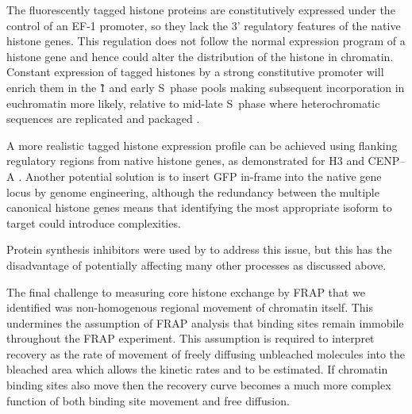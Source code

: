     The fluorescently tagged histone proteins are constitutively expressed
    under the control of an EF-1\textalpha{} promoter,
    so they lack the 3' regulatory features of the native histone genes.
    This regulation does not follow the normal
    expression program of a histone gene
    and hence could alter the distribution of the histone in chromatin.
    Constant expression of tagged histones by a strong constitutive promoter
    will enrich them in the \G1{} and early S~phase pools
    making subsequent incorporation in euchromatin more likely,
    relative to mid-late S~phase where heterochromatic sequences
    are replicated and packaged \citep{DNA-replication-timing}.

    A more realistic tagged histone expression profile can be achieved using
    flanking regulatory regions from native histone genes,
    as demonstrated for H3 and CENP--A \citep{pMH3-plasmid,Kevin-pCA-TAG}.
    Another potential solution is to insert GFP
    in-frame into the native gene locus by genome engineering,
    although the redundancy between the multiple canonical histone genes means
    that identifying the most appropriate isoform to target
    could introduce complexities.

    Protein synthesis inhibitors were used by \citet{KimuraCook}
    to address this issue,
    but this has the disadvantage of potentially affecting
    many other processes as discussed above.



    The final challenge to measuring core histone
    exchange by FRAP that we identified
    was non-homogenous regional movement of chromatin itself.
    This undermines the assumption of FRAP analysis that binding sites
    remain immobile throughout the FRAP experiment.
    This assumption is required to interpret recovery
    as the rate of movement of freely diffusing unbleached molecules into the
    bleached area which allows the kinetic
    rates \Kon{} and \Koff{} to be estimated.
    If chromatin binding sites also move then the recovery curve becomes a
    much more complex function of both binding site movement and free diffusion.


